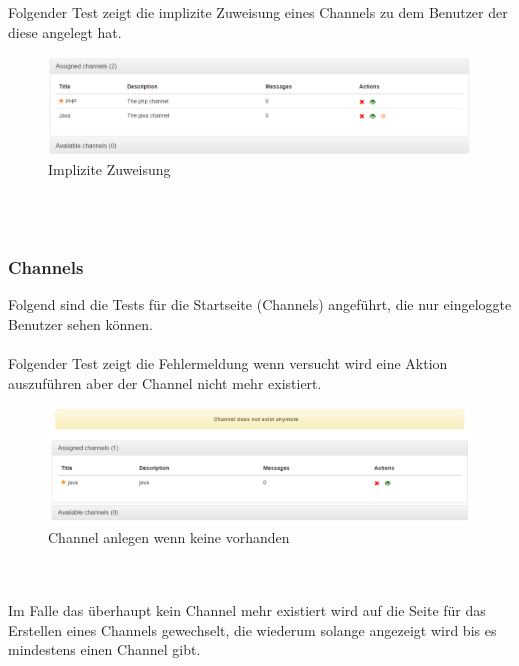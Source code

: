 \documentclass[11pt, a4paper, twoside]{article}   	%
\begin{document}
Folgender Test zeigt die implizite Zuweisung eines Channels zu dem Benutzer der diese angelegt hat.
\begin{figure}[h]
	\centering
	\includegraphics[scale=0.5]{images/start_channels_assigned_after_creation.PNG}
	\caption
	{Implizite Zuweisung}
\end{figure}\\\\
\newpage

\subsubsection{Channels}
Folgend sind die Tests für die Startseite (Channels) angeführt, die nur eingeloggte Benutzer sehen können.\\\\
Folgender Test zeigt die Fehlermeldung wenn versucht wird eine Aktion auszuführen aber der Channel nicht mehr existiert.\\
\begin{figure}[h]
	\centering
	\includegraphics[scale=0.5]{images/start_channels_action_fail.PNG}
	\caption
	{Channel anlegen wenn keine vorhanden}
\end{figure}\\\\

Im Falle das überhaupt kein Channel mehr existiert wird auf die Seite für das Erstellen eines Channels gewechselt, die wiederum solange angezeigt wird bis es mindestens einen Channel gibt.
\newpage
\end{document}
